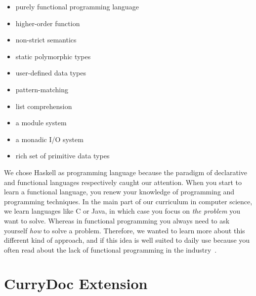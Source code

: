 \documentclass[%
	latex,%
	a4paper,%
	oneside,%
	chapterprefix,%
	headsepline,%
	12pt%
]{scrbook}
\begin{document}
\begin{itemize}
\item purely functional programming language
\item higher-order function
\item non-strict semantics
\item static polymorphic types
\item user-defined data types
\item pattern-matching
\item list comprehension
\item a module system
\item a monadic I/O system
\item rich set of primitive data types
\end{itemize} 

We chose Haskell as programming language because the paradigm of
declarative and functional languages respectively caught our
attention. %
When you start to learn a functional language, you renew your
knowledge of programming and programming techniques. %
In the main part of our curriculum in computer science, we learn
languages like C or Java, in which case you focus on \emph{the
  problem} you want to solve. %
Whereas in functional programming you always need to ask yourself
\emph{how} to solve a problem. %
Therefore, we wanted to learn more about this different kind of
approach, and if this idea is well suited to daily use because you
often read about the lack of functional programming in the industry~\cite{noone}. %

\section{CurryDoc Extension}\label{implementation:currydoc}
\end{document}
